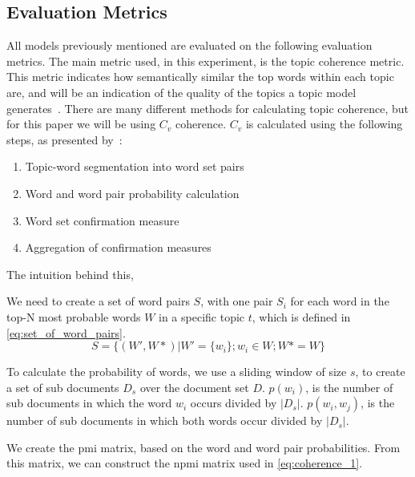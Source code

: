\subsection{Evaluation Metrics}\label{sec:experiment_metrics}
All models previously mentioned are evaluated on the following evaluation metrics.
The main metric used, in this experiment, is the topic coherence metric.
This metric indicates how semantically similar the top words within each topic are, and will be an indication of the quality of the topics a topic model generates~\cite{topic_coherence_2015}.
There are many different methods for calculating topic coherence, but for this paper we will be using $C_v$ coherence.
$C_v$ is calculated using the following steps, as presented by~\citet{Syed2017coherence}:
\begin{enumerate}
	\item Topic-word segmentation into word set pairs
	\item Word and word pair probability calculation
	\item Word set confirmation measure
	\item Aggregation of confirmation measures
\end{enumerate}
The intuition behind this, 

We need to create a set of word pairs $S$, with one pair $S_i$ for each word in the top-N most probable words $W$ in a specific topic $t$, which is defined in \autoref{eq:set_of_word_pairs}.
\begin{equation}\label{eq:set_of_word_pairs}
	S = \{(W', W*)|W' = \{w_i\};w_i \in W;W* = W\}
\end{equation}

To calculate the probability of words, we use a sliding window of size $s$, to create a set of sub documents $D_s$ over the document set $D$.
$p(w_i)$, is the number of sub documents in which the word $w_i$ occurs divided by $|D_s|$.
$p(w_i, w_j)$, is the number of sub documents in which both words occur divided by $|D_s|$. 

We create the \gls{pmi} matrix, based on the word and word pair probabilities.
From this matrix, we can construct the \acrshort{npmi} matrix used in \autoref{eq:coherence_1}.

